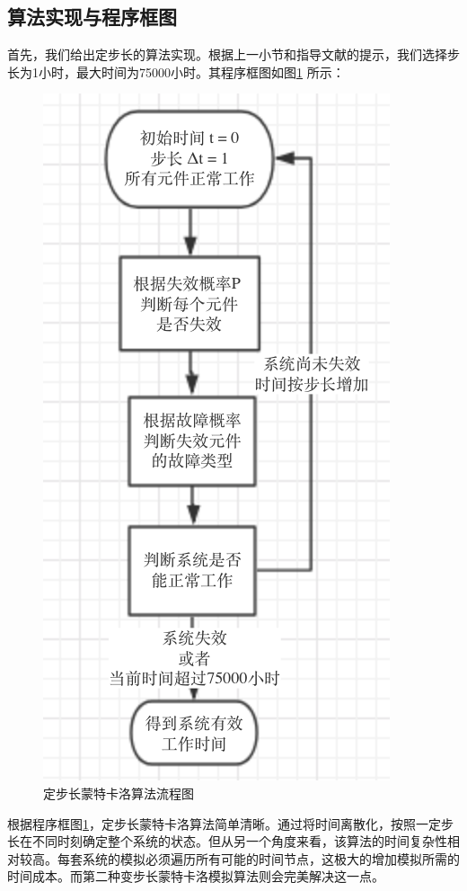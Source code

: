 \documentclass[10.5pt,twocolumn]{jbuaa}
\begin{document}
\subsection{算法实现与程序框图}
首先，我们给出定步长的算法实现。根据上一小节和指导文献\cite{cite1}的提示，我们选择步长为1小时，最大时间为75000小时。其程序框图如图\ref{fig:2} 所示：
\begin{figure}[H]
	\centering
	\includegraphics{fig2}
	\caption{定步长蒙特卡洛算法流程图}
	\label{fig:2}
\end{figure}
根据程序框图\ref{fig:2}，定步长蒙特卡洛算法简单清晰。通过将时间离散化，按照一定步长在不同时刻确定整个系统的状态。但从另一个角度来看，该算法的时间复杂性相对较高。每套系统的模拟必须遍历所有可能的时间节点，这极大的增加模拟所需的时间成本。而第二种变步长蒙特卡洛模拟算法则会完美解决这一点。
\end{document}
